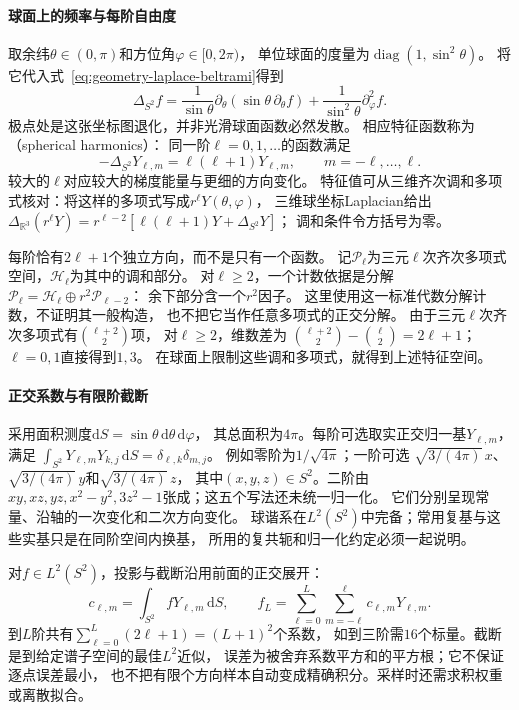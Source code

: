 \paragraph{球面上的频率与每阶自由度}
取余纬$\theta\in(0,\pi)$和方位角$\varphi\in[0,2\pi)$，
单位球面的度量为$\operatorname{diag}(1,\sin^2\theta)$。
将它代入式~\eqref{eq:geometry-laplace-beltrami}得到
\[
 \Delta_{S^2}f=
 \frac1{\sin\theta}\partial_\theta(\sin\theta\,\partial_\theta f)
 +\frac1{\sin^2\theta}\partial_\varphi^2 f.
\]
极点处是这张坐标图退化，并非光滑球面函数必然发散。
相应特征函数称为（spherical harmonics）：
同一阶$\ell=0,1,\ldots$的函数满足
\begin{equation}
 -\Delta_{S^2}Y_{\ell,m}=\ell(\ell+1)Y_{\ell,m},
 \qquad m=-\ell,\ldots,\ell.
 \label{eq:functional-spherical-harmonic-eigenvalue}
\end{equation}
较大的$\ell$对应较大的梯度能量与更细的方向变化。
特征值可从三维齐次调和多项式核对：将这样的多项式写成$r^\ell Y(\theta,\varphi)$，
三维球坐标Laplacian给出
$\Delta_{\mathbb R^3}(r^\ell Y)=r^{\ell-2}[\ell(\ell+1)Y+\Delta_{S^2}Y]$；
调和条件令方括号为零。

每阶恰有$2\ell+1$个独立方向，而不是只有一个函数。
记$\mathcal P_\ell$为三元$\ell$次齐次多项式空间，$\mathcal H_\ell$为其中的调和部分。
对$\ell\geq2$，一个计数依据是分解
$\mathcal P_\ell=\mathcal H_\ell\oplus r^2\mathcal P_{\ell-2}$：
余下部分含一个$r^2$因子。
这里使用这一标准代数分解计数，不证明其一般构造，
也不把它当作任意多项式的正交分解。
由于三元$\ell$次齐次多项式有$\binom{\ell+2}{2}$项，
对$\ell\geq2$，维数差为
$\binom{\ell+2}{2}-\binom\ell2=2\ell+1$；$\ell=0,1$直接得到$1,3$。
在球面上限制这些调和多项式，就得到上述特征空间。

\paragraph{正交系数与有限阶截断}
采用面积测度$\mathrm dS=\sin\theta\,\mathrm d\theta\,\mathrm d\varphi$，
其总面积为$4\pi$。每阶可选取实正交归一基$Y_{\ell,m}$，满足
$\int_{S^2}Y_{\ell,m}Y_{k,j}\,\mathrm dS=\delta_{\ell,k}\delta_{m,j}$。
例如零阶为$1/\sqrt{4\pi}$；一阶可选
$\sqrt{3/(4\pi)}\,x$、$\sqrt{3/(4\pi)}\,y$和$\sqrt{3/(4\pi)}\,z$，
其中$(x,y,z)\in S^2$。二阶由
$xy,xz,yz,x^2-y^2,3z^2-1$张成；这五个写法还未统一归一化。
它们分别呈现常量、沿轴的一次变化和二次方向变化。
球谐系在$L^2(S^2)$中完备；常用复基与这些实基只是在同阶空间内换基，
所用的复共轭和归一化约定必须一起说明。

对$f\in L^2(S^2)$，投影与截断沿用前面的正交展开：
\begin{equation}
 c_{\ell,m}=\int_{S^2}fY_{\ell,m}\,\mathrm dS,
 \qquad
 f_L=\sum_{\ell=0}^L\sum_{m=-\ell}^{\ell}c_{\ell,m}Y_{\ell,m}.
 \label{eq:functional-spherical-harmonic-truncation}
\end{equation}
到$L$阶共有$\sum_{\ell=0}^L(2\ell+1)=(L+1)^2$个系数，
如到三阶需$16$个标量。截断是到给定谱子空间的最佳$L^2$近似，
误差为被舍弃系数平方和的平方根；它不保证逐点误差最小，
也不把有限个方向样本自动变成精确积分。采样时还需求积权重或离散拟合。

